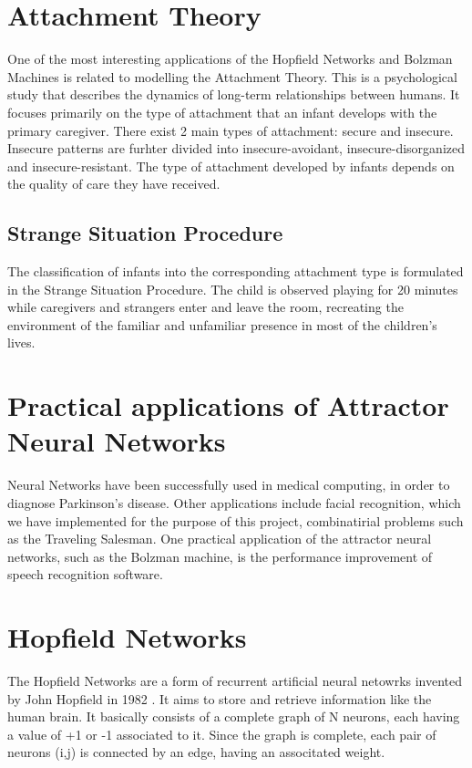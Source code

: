 \documentclass[11pt,a4paper,oneside]{report}
\begin{document}
\section{Attachment Theory}

One of the most interesting applications of the Hopfield Networks and Bolzman Machines is related to modelling the Attachment Theory. This is a psychological study that describes the dynamics of long-term relationships between humans\cite{website:attachment_theory_wiki}. It focuses primarily on the type of attachment that an infant develops with the primary caregiver. There exist 2 main types of attachment: secure and insecure. Insecure patterns are furhter divided into insecure-avoidant, insecure-disorganized and insecure-resistant. The type of attachment developed by infants depends on the quality of care they have received\cite{website:attachment_theory_wiki}.

\subsection{Strange Situation Procedure}

The classification of infants into the corresponding attachment type is formulated in the Strange Situation Procedure. The child is observed playing for 20 minutes while caregivers and strangers enter and leave the room, recreating the environment of the familiar and unfamiliar presence in most of the children's lives.\cite{website:attachment_patterns_wiki}

\section{Practical applications of Attractor Neural Networks}

Neural Networks have been successfully used in medical computing, in order to diagnose Parkinson's disease\cite{nets_parkinsons}. Other applications include facial recognition, which we have implemented for the purpose of this project, combinatirial problems such as the Traveling Salesman\cite{hopfield_laferriere}. 
One practical application of the attractor neural networks, such as the Bolzman machine, is the performance improvement of speech recognition software\cite{speech_nets}.

\section{Hopfield Networks}
The Hopfield Networks are a form of recurrent artificial neural netowrks invented by John Hopfield in 1982 \cite{hopfield_wiki}. It aims to store and retrieve information like the human brain. It basically consists of a complete graph of N neurons, each having a value of +1 or -1 associated to it. Since the graph is complete, each pair of neurons (i,j) is connected by an edge, having an associtated weight. 
\end{document}

